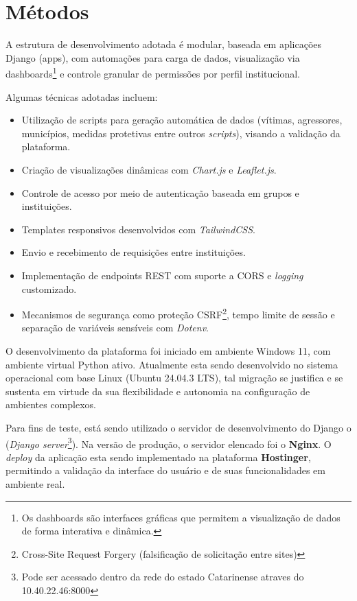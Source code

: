 \section{Métodos}

A estrutura de desenvolvimento adotada é modular, baseada em aplicações Django (apps), com automações para carga de dados, visualização via dashboards\footnote{Os dashboards são interfaces gráficas que permitem a visualização de dados de forma interativa e dinâmica.} e controle granular de permissões por perfil institucional.

Algumas técnicas adotadas incluem:
\begin{itemize}
\item Utilização de scripts para geração automática de dados (vítimas, agressores, municípios, medidas protetivas entre outros \textit{scripts}), visando a validação da plataforma.
\item Criação de visualizações dinâmicas com \textit{Chart.js} e \textit{Leaflet.js}.
\item Controle de acesso por meio de autenticação baseada em grupos e instituições.
\item Templates responsivos desenvolvidos com \textit{TailwindCSS}.
\item Envio e recebimento de requisições entre instituições.
\item Implementação de endpoints REST com suporte a CORS e \textit{logging} customizado.
\item Mecanismos de segurança como proteção CSRF\footnote{Cross-Site Request Forgery (falsificação de solicitação entre sites)}, tempo limite de sessão e separação de variáveis sensíveis com \textit{Dotenv}.
\end{itemize}

\par O desenvolvimento da plataforma foi iniciado em ambiente Windows 11, com ambiente virtual Python ativo. Atualmente esta sendo desenvolvido no sistema operacional com base Linux (Ubuntu 24.04.3 LTS), tal migração se justifica e se sustenta em virtude da sua flexibilidade e autonomia na configuração de ambientes complexos.

\par Para fins de teste, está sendo utilizado o servidor de desenvolvimento do Django o (\textit{Django server}\footnote{Pode ser acessado dentro da rede do estado Catarinense atraves do 10.40.22.46:8000}). Na versão de produção, o servidor elencado foi o \textbf{Nginx}. O \textit{deploy} da aplicação esta sendo implementado na plataforma \textbf{Hostinger}, permitindo a validação da interface do usuário e de suas funcionalidades em ambiente real.

